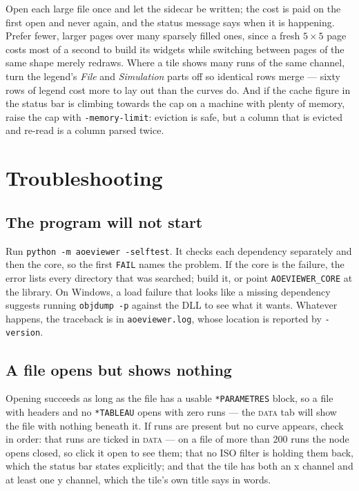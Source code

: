 \documentclass[11pt,a4paper,oneside]{report}
\newcommand{\code}[1]{\texttt{#1}}
\newcommand{\tab}[1]{\textsc{#1}}
\begin{document}
Open each large file once and let the sidecar be written; the cost is paid on
the first open and never again, and the status message says when it is
happening. Prefer fewer, larger pages over many sparsely filled ones, since a
fresh $5 \times 5$ page costs most of a second to build its widgets while
switching between pages of the same shape merely redraws. Where a tile shows
many runs of the same channel, turn the legend's \emph{File} and
\emph{Simulation} parts off so identical rows merge --- sixty rows of legend
cost more to lay out than the curves do. And if the cache figure in the status
bar is climbing towards the cap on a machine with plenty of memory, raise the
cap with \code{-memory-limit}: eviction is safe, but a column that is evicted
and re-read is a column parsed twice.

\section{Troubleshooting}

\subsection{The program will not start}

Run \code{python -m aoeviewer -selftest}. It checks each dependency separately
and then the core, so the first \code{FAIL} names the problem. If the core is
the failure, the error lists every directory that was searched; build it, or
point \code{AOEVIEWER\_CORE} at the library. On Windows, a load failure that
looks like a missing dependency suggests running \code{objdump -p} against the
DLL to see what it wants. Whatever happens, the traceback is in
\code{aoeviewer.log}, whose location is reported by \code{-version}.

\subsection{A file opens but shows nothing}

Opening succeeds as long as the file has a usable \code{*PARAMETRES} block, so a
file with headers and no \code{*TABLEAU} opens with zero runs --- the
\tab{data} tab will show the file with nothing beneath it. If runs are present
but no curve appears, check in order: that runs are ticked in \tab{data} --- on
a file of more than 200 runs the node opens closed, so click it open to see
them; that no ISO filter is holding them back, which the status bar states
explicitly; and that the tile has both an x channel and at least one y channel,
which the tile's own title says in words.
\end{document}
